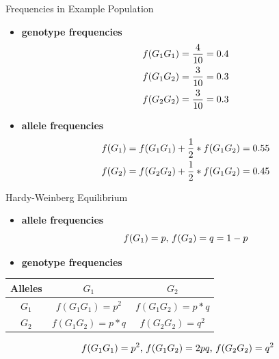 \documentclass[ignorenonframetext,]{beamer}
\begin{document}
\begin{frame}{Frequencies in Example Population}
\protect\hypertarget{frequencies-in-example-population}{}

\begin{itemize}
\item
  \textbf{genotype frequencies} \vspace{-2ex} \begin{align}
  f(G_1G_1) &= \frac{4}{10} = 0.4 \notag \\
  f(G_1G_2) &= \frac{3}{10} = 0.3 \notag \\
  f(G_2G_2) &= \frac{3}{10} = 0.3 \notag
  \end{align}
\item
  \textbf{allele frequencies} \vspace{-2ex} \begin{align}
  f(G_1) &= f(G_1G_1) + {1\over 2}*f(G_1G_2) = 0.55 \notag \\
  f(G_2) &= f(G_2G_2) + {1\over 2}*f(G_1G_2) = 0.45 \notag
  \end{align}
\end{itemize}

\end{frame}

\begin{frame}{Hardy-Weinberg Equilibrium}
\protect\hypertarget{hardy-weinberg-equilibrium}{}

\begin{itemize}
\item
  \textbf{allele frequencies} \begin{equation}
  f(G_1) = p  \text{, } f(G_2) = q = 1-p \notag
  \end{equation}
\item
  \textbf{genotype frequencies}
\end{itemize}

\begin{longtable}[]{@{}ccc@{}}
\toprule
Alleles & \(G_1\) & \(G_2\)\tabularnewline
\midrule
\endhead
\(G_1\) & \(f(G_1G_1) = p^2\) & \(f(G_1G_2) = p*q\)\tabularnewline
\(G_2\) & \(f(G_1G_2) = p*q\) & \(f(G_2G_2) = q^2\)\tabularnewline
\bottomrule
\end{longtable}

\begin{equation}
f(G_1G_1) = p^2 \text{, } f(G_1G_2) = 2pq  \text{, } f(G_2G_2) = q^2 \notag
\end{equation}

\end{frame}
\end{document}
